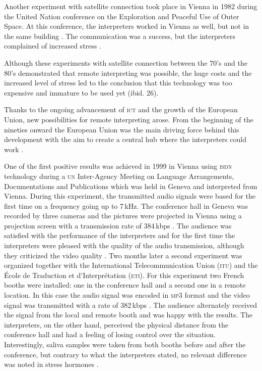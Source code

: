 \documentclass[output=paper]{langsci/langscibook}
\begin{document}
Another experiment with satellite connection took place in Vienna in 1982 during the United Nation conference on the Exploration and Peaceful Use of Outer Space. At this conference, the interpreters worked in Vienna as well, but not in the same building \citep[10]{Andres2009}. The communication was a success, but the interpreters complained of increased stress \citep[26]{UNESCO1987}.

Although these experiments with satellite connection between the 70’s and the 80’s demonstrated that remote interpreting was possible, the huge costs and the increased level of stress led to the conclusion that this technology was too expensive and immature to be used yet (ibid. 26).

Thanks to the ongoing advancement of \textsc{ict} and the growth of the European Union, new possibilities for remote interpreting arose. From the beginning of the nineties onward the European Union was the main driving force behind this development with the aim to create a central hub where the interpreters could work \citep[3]{Braun2011b}.

One of the first positive results was achieved in 1999 in Vienna using \textsc{isdn} technology during a \textsc{un} Inter-Agency Meeting on Language Arrangements, Documentations and Publications which was held in Geneva and interpreted from Vienna. During this experiment, the transmitted audio signals were based for the first time on a frequency going up to 7\,kHz. The conference hall in Geneva was recorded by three cameras and the pictures were projected in Vienna using a projection screen with a transmission rate of 384\,kbps \citep[63]{Mouzourakis2006}. The audience was satisfied with the performance of the interpreters and for the first time the interpreters were pleased with the quality of the audio transmission, although they criticized the video quality \citep[11]{Andres2009}. Two months later a second experiment was organized together with the International Telecommunication Union (\textsc{itu}) and the École de Traduction et d’Interprétation (\textsc{eti}). For this experiment two French booths were installed: one in the conference hall and a second one in a remote location. In this case the audio signal was encoded in \textsc{mp3} format and the video signal was transmitted with a rate of 382\,kbps \citep[63]{Mouzourakis2006}. The audience alternately received the signal from the local and remote booth and was happy with the results. The interpreters, on the other hand, perceived the physical distance from the conference hall and had a feeling of losing control over the situation. Interestingly, saliva samples were taken from both booths before and after the conference, but contrary to what the interpreters stated, no relevant difference was noted in stress hormones \citep{Moser-Mercer2003}.
\end{document}
